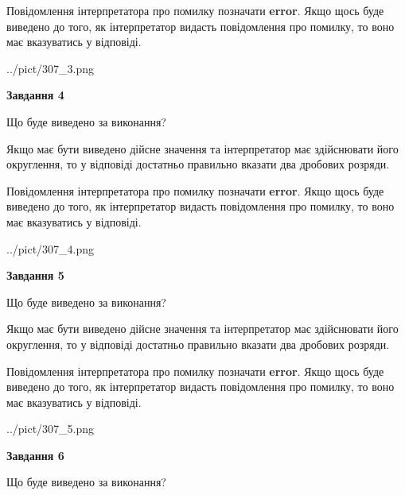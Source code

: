\documentclass[12pt, ukrainian]{article}
\begin{document}
{\begin {Large}
Повідомлення інтерпретатора про помилку позначати \textbf{error}.
Якщо щось буде виведено до того, як інтерпретатор видасть повідомлення про помилку, 
то воно має вказуватись у відповіді. \par

\begin{center}
	{../pict/307_3.png}
\end{center}
\newpage

{\begin {center}\textbf{Завдання 4}\end {center}}\par
Що буде виведено за виконання? \par

Якщо має бути виведено дійсне значення та інтерпретатор має здійснювати його округлення, 
то у відповіді достатньо правильно вказати два дробових розряди.

Повідомлення інтерпретатора про помилку позначати \textbf{error}.
Якщо щось буде виведено до того, як інтерпретатор видасть повідомлення про помилку, 
то воно має вказуватись у відповіді. \par

\begin{center}
	{../pict/307_4.png}
\end{center}
\newpage

{\begin {center}\textbf{Завдання 5}\end {center}}\par
Що буде виведено за виконання? \par

Якщо має бути виведено дійсне значення та інтерпретатор має здійснювати його округлення, 
то у відповіді достатньо правильно вказати два дробових розряди.

Повідомлення інтерпретатора про помилку позначати \textbf{error}.
Якщо щось буде виведено до того, як інтерпретатор видасть повідомлення про помилку, 
то воно має вказуватись у відповіді. \par

\begin{center}
	{../pict/307_5.png}
\end{center}
\newpage

{\begin {center}\textbf{Завдання 6}\end {center}}\par
Що буде виведено за виконання? \par


\end{Large}}
\end{document}

